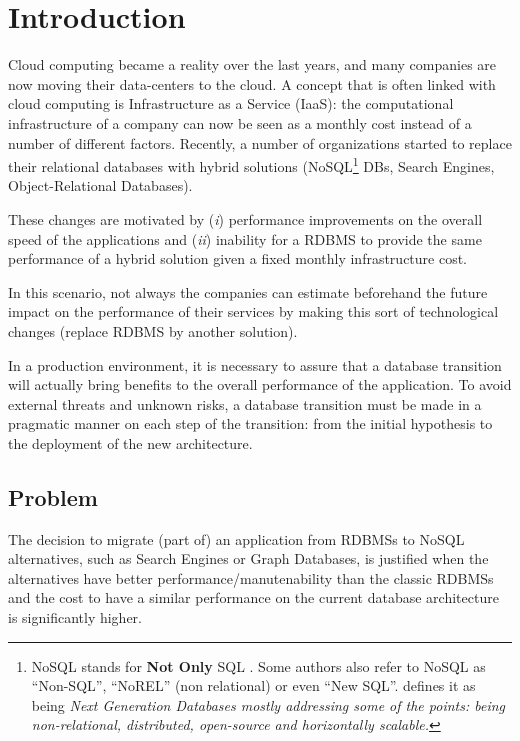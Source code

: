 \chapter{Introduction}\label{introductionChap}

Cloud computing became a reality over the last years, and many companies are now moving their data-centers to the cloud. 
A concept that is often linked with cloud computing is Infrastructure as a Service (IaaS): the computational infrastructure of a company can now be seen as a monthly cost instead of a number of different factors. 
Recently, a number of organizations started to replace their relational databases with hybrid solutions (NoSQL\footnote{ NoSQL stands for  \textbf{Not Only} SQL \cite{7023585}. Some authors also refer to NoSQL as ``Non-SQL'', ``NoREL'' (non relational) or even ``New SQL''. \cite{NOSQLDB} defines it as being \textit{
Next Generation Databases mostly addressing some of the points: being non-relational, distributed, open-source and horizontally scalable.}} DBs, Search Engines, Object-Relational Databases). 

These changes are motivated by (\textit{i}) performance improvements on the overall speed of the applications and (\textit{ii}) inability for a RDBMS to provide the same performance of a hybrid solution given a fixed monthly infrastructure cost.

In this scenario, not always the companies can estimate beforehand the future impact on the performance of their services by making this sort of technological changes (replace RDBMS by another solution).

In a production environment, it is necessary to assure that a database transition will actually bring benefits to the overall performance of the application. To avoid external threats and unknown risks, a database transition must be made in a pragmatic manner on each step of the transition: from the initial hypothesis to the deployment of the new architecture.


\section{Problem}

The decision to migrate (part of) an application from RDBMSs to NoSQL alternatives, such as Search Engines or Graph Databases, is justified when the alternatives have better performance/manutenability than the classic RDBMSs and the cost to have a similar performance on the current database architecture is significantly higher. 


